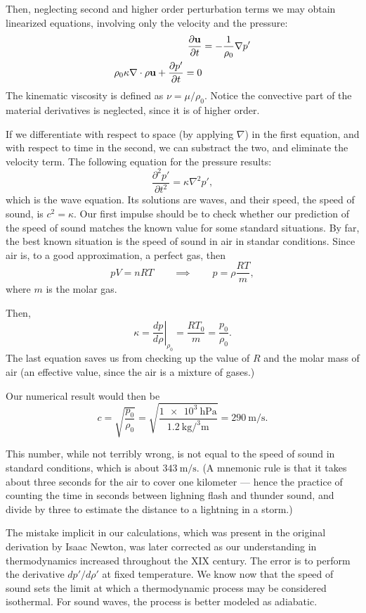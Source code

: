 Then, neglecting second and higher order perturbation terms we may
obtain linearized equations, involving only the velocity and the
pressure:
\begin{align}
  \label{eq:sound_lin_cont}
  \frac{\partial \mathbf{u} }{\partial t} & = - \frac{1}{\rho_0} \nabla p' \\
  \rho_0 \kappa \nabla \cdot \mathbf{\rho u} +
  \frac{\partial p'}{\partial t} =0 
\end{align}
The kinematic viscosity is defined as $ \nu=\mu/\rho_0$.%
Notice the convective part of the material derivatives is neglected,
since it is of higher order.

If we differentiate with respect to space (by applying $ \nabla$) in
the first equation, and with respect to time in the second, we can
substract the two, and eliminate the velocity term. 
The following equation for the pressure results:
\[
\frac{\partial^2 p' }{\partial t^2 }  = \kappa \nabla^2 p' ,
\]
which is the wave equation. Its solutions are waves, and their speed,
the speed of sound, is $c^2 = \kappa $. Our first impulse should be to
check whether our prediction of the speed of sound matches the known
value for some standard situations. By far, the best known situation
is the speed of sound in air in standar conditions. Since air is, to
a good approximation, a perfect gas, then
\[
p V = n R T \qquad\implies\qquad p  = \rho\frac{ R T}{m},
\]
where $m$ is the molar gas.

Then,
\[
\kappa =  \left. \frac{d p}{d\rho} \right|_{\rho_0} =
 \frac{ R T_0}{m} = \frac{ p_0 }{ \rho_0 } .
\]
The last equation saves us from checking up the value of $R$ and the
molar mass of air (an effective value, since the air is a mixture of
gases.)

Our numerical result would then be
\[
c= \sqrt{\frac{ p_0 }{ \rho_0 }} =
\sqrt{\frac%
  { \SI{1e3}{\hecto\pascal} }%
  {\SI{1.2}{\kilo\gram\per\cubed\meter}}} =
\SI{290}{\meter\per\second} .
\]

This number, while not terribly wrong, is not equal to the speed of
sound in standard conditions, which is about
$\SI{343}{\meter\per\second}$. (A mnemonic rule is that it takes about
three seconds for the air to cover one kilometer --- hence the
practice of counting the time in seconds between lighning flash and
thunder sound, and divide by three to estimate the distance to a
lightning in a storm.)

The mistake implicit in our calculations, which was present in the
original derivation by Isaac Newton, was later corrected as our
understanding in thermodynamics increased throughout the XIX
century. The error is to perform the derivative $d p' / d\rho'$ at
fixed temperature. We know now that the speed of sound sets the limit
at which a thermodynamic process may be considered isothermal. For
sound waves, the process is better modeled as
adiabatic.

